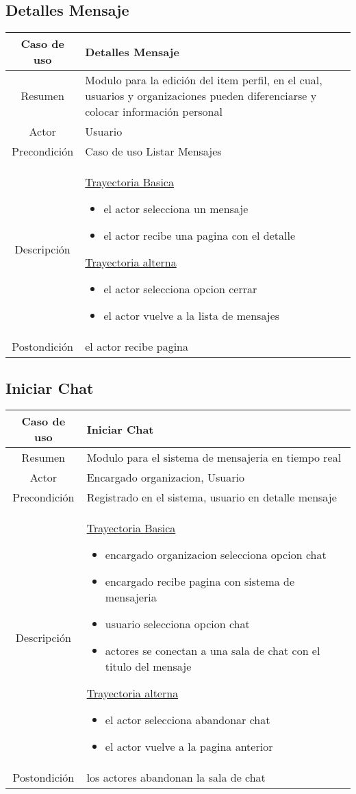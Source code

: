 \documentclass[letterpaper,openright,10pt,oneside]{report}
\begin{document}
\subsection{Detalles Mensaje}

\begin{tabular}{|c|p{110mm}|}
\hline
	Caso de uso & Detalles Mensaje\\
\hline
	Resumen & Modulo para la edición del item perfil, en el cual,
	usuarios y organizaciones pueden diferenciarse y colocar información personal\\
\hline
	Actor & Usuario\\
\hline
	Precondición & Caso de uso Listar Mensajes\\
\hline
	Descripción & 
	\underline{Trayectoria Basica}
	\begin{itemize}
		\item el actor selecciona un mensaje
		\item el actor recibe una pagina con el detalle
	\end{itemize}
	\underline{Trayectoria alterna}
	\begin{itemize}
		\item el actor selecciona opcion cerrar
		\item el actor vuelve a la lista de mensajes
	\end{itemize}\\
\hline
	Postondición & el actor recibe pagina\\
\hline
\end{tabular}
\subsection{Iniciar Chat}

\begin{tabular}{|c|p{110mm}|}
\hline
	Caso de uso & Iniciar Chat\\
\hline
	Resumen & Modulo para el sistema de mensajeria en tiempo real\\
\hline
	Actor & Encargado organizacion, Usuario\\
\hline
	Precondición & Registrado en el sistema, usuario en detalle mensaje\\
\hline
	Descripción & 
	\underline{Trayectoria Basica}
	\begin{itemize}
		\item encargado organizacion selecciona opcion chat
		\item encargado recibe pagina con sistema de mensajeria
		\item usuario selecciona opcion chat
		\item actores se conectan a una sala de chat con el titulo del mensaje
	\end{itemize}
	\underline{Trayectoria alterna}
	\begin{itemize}
		\item el actor selecciona abandonar chat
		\item el actor vuelve a la pagina anterior
	\end{itemize}\\
\hline
	Postondición & los actores abandonan la sala de chat\\
\hline
\end{tabular}
\end{document}
